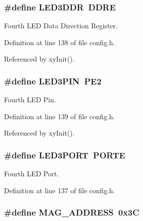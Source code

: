 \hypertarget{group__config_ga09535652dd0ca340b20840c848cb6093}{
\subsubsection[{L\-E\-D3\-D\-D\-R}]{\setlength{\rightskip}{0pt plus 5cm}\#define L\-E\-D3\-D\-D\-R~D\-D\-R\-E}}\label{group__config_ga09535652dd0ca340b20840c848cb6093}


Fourth L\-E\-D Data Direction Register. 



Definition at line 138 of file config.\-h.



Referenced by xy\-Init().

\hypertarget{group__config_ga2663b8fc01c4753562adc572cf12a5ed}{
\subsubsection[{L\-E\-D3\-P\-I\-N}]{\setlength{\rightskip}{0pt plus 5cm}\#define L\-E\-D3\-P\-I\-N~P\-E2}}\label{group__config_ga2663b8fc01c4753562adc572cf12a5ed}


Fourth L\-E\-D Pin. 



Definition at line 139 of file config.\-h.



Referenced by xy\-Init().

\hypertarget{group__config_ga63df95c1a0ce0e770964ca35e4032fb6}{
\subsubsection[{L\-E\-D3\-P\-O\-R\-T}]{\setlength{\rightskip}{0pt plus 5cm}\#define L\-E\-D3\-P\-O\-R\-T~P\-O\-R\-T\-E}}\label{group__config_ga63df95c1a0ce0e770964ca35e4032fb6}


Fourth L\-E\-D Port. 



Definition at line 137 of file config.\-h.

\hypertarget{group__config_gade4e63fac819c67040e374f08d2d7230}{
\subsubsection[{M\-A\-G\-\_\-\-A\-D\-D\-R\-E\-S\-S}]{\setlength{\rightskip}{0pt plus 5cm}\#define M\-A\-G\-\_\-\-A\-D\-D\-R\-E\-S\-S~0x3\-C}}\label{group__config_gade4e63fac819c67040e374f08d2d7230}


